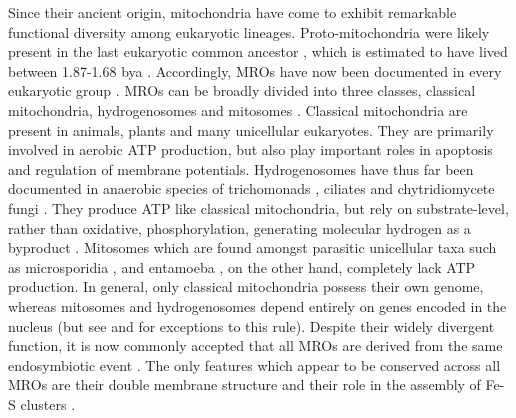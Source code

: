 \documentclass[12pt,twoside]{reedthesis}
\begin{document}
Since their ancient origin, mitochondria have come to exhibit remarkable functional diversity among eukaryotic lineages. 
Proto-mitochondria were likely present in the last eukaryotic common ancestor \citep{archibald_endosymbiosis_2015}, which is estimated to have lived between 1.87-1.68 bya \citep{parfrey_estimating_2011}. 
Accordingly, \gls{MROs} have now been documented in every eukaryotic group \citep{baldauf_deep_2003, shiflett_mitochondrion-related_2010}.
\gls{MROs} can be broadly divided into three classes, classical mitochondria, hydrogenosomes and mitosomes \citep{shiflett_mitochondrion-related_2010}.
Classical mitochondria are present in animals, plants and many unicellular eukaryotes.
They are primarily involved in aerobic ATP production, but also play important roles in apoptosis and regulation of membrane potentials.
Hydrogenosomes have thus far been documented in anaerobic species of trichomonads \citep{lindmark_hydrogenosome_1973}, ciliates \citep{yarlett_hydrogenosomes_1981} and chytridiomycete fungi \citep{yarlett_hydrogenosomes_1986}.
They produce ATP like classical mitochondria, but rely on substrate-level, rather than oxidative, phosphorylation, generating molecular hydrogen as a byproduct \citep{muller_hydrogenosome_1994}.
Mitosomes which are found amongst parasitic unicellular taxa such as microsporidia \citep{williams_mitochondrial_2002}, and entamoeba \citep{mai_hsp60_1999}, on the other hand, completely lack ATP production.
In general, only classical mitochondria possess their own genome, whereas mitosomes and hydrogenosomes depend entirely on genes encoded in the nucleus (but see \citealp{boxma_anaerobic_2005} and \citealp{wawrzyniak_complete_2008} for exceptions to this rule).
Despite their widely divergent function, it is now commonly accepted that all \gls{MROs} are derived from the same endosymbiotic event \citep{embley_mitochondria_2003, shiflett_mitochondrion-related_2010}.
The only features which appear to be conserved across all \gls{MROs} are their double membrane structure and their role in the assembly of \gls{Fe-S} clusters \citep{lill_maturation_2000, shiflett_mitochondrion-related_2010}.
\end{document}
